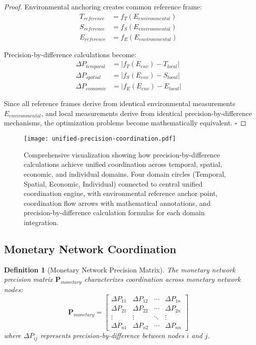 \documentclass[12pt,a4paper]{article}
\newtheorem{definition}[theorem]{Definition}
\begin{document}
\begin{proof}
Environmental anchoring creates common reference frame:
\begin{align}
T_{reference} &= f_T(E_{environmental}) \\
S_{reference} &= f_S(E_{environmental}) \\
E_{reference} &= f_E(E_{environmental})
\end{align}

Precision-by-difference calculations become:
\begin{align}
\Delta P_{temporal} &= |f_T(E_{env}) - T_{local}| \\
\Delta P_{spatial} &= |f_S(E_{env}) - S_{local}| \\
\Delta P_{economic} &= |f_E(E_{env}) - E_{local}|
\end{align}

Since all reference frames derive from identical environmental measurements $E_{environmental}$, and local measurements derive from identical precision-by-difference mechanisms, the optimization problems become mathematically equivalent. $\square$
\end{proof}

\begin{figure}[H]
\centering
\texttt{[image: unified-precision-coordination.pdf]}
\caption{Comprehensive visualization showing how precision-by-difference calculations achieve unified coordination across temporal, spatial, economic, and individual domains. Four domain circles (Temporal, Spatial, Economic, Individual) connected to central unified coordination engine, with environmental reference anchor point, coordination flow arrows with mathematical annotations, and precision-by-difference calculation formulas for each domain integration.}
\label{fig:unified_coordination}
\end{figure}

\subsection{Monetary Network Coordination}

\begin{definition}[Monetary Network Precision Matrix]
The monetary network precision matrix $\mathbf{P}_{monetary}$ characterizes coordination across monetary network nodes:
\begin{equation}
\mathbf{P}_{monetary} = \begin{bmatrix}
\Delta P_{11} & \Delta P_{12} & \cdots & \Delta P_{1n} \\
\Delta P_{21} & \Delta P_{22} & \cdots & \Delta P_{2n} \\
\vdots & \vdots & \ddots & \vdots \\
\Delta P_{n1} & \Delta P_{n2} & \cdots & \Delta P_{nn}
\end{bmatrix}
\end{equation}
where $\Delta P_{ij}$ represents precision-by-difference between nodes $i$ and $j$.
\end{definition}
\end{document}

